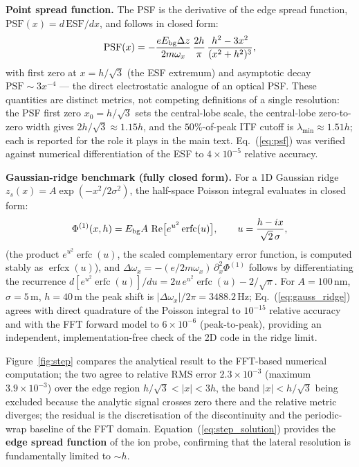 \documentclass[12pt,a4paper]{article}
\begin{document}
\textbf{Point spread function.}
The PSF is the derivative of the edge spread function,
$\mathrm{PSF}(x) = d\,\mathrm{ESF}/dx$, and follows in closed form:
\begin{equation}
\mathrm{PSF}(x) = -\frac{e E_{\rm bg}\Delta z}{2m\omega_x}\,
    \frac{2h}{\pi}\,\frac{h^2 - 3x^2}{(x^2+h^2)^3},
\label{eq:psf}
\end{equation}
with first zero at $x = h/\sqrt{3}$ (the ESF extremum) and asymptotic
decay $\mathrm{PSF}\sim 3x^{-4}$ --- the direct electrostatic analogue of
an optical PSF.  These quantities are distinct metrics, not competing
definitions of a single resolution: the PSF first zero
$x_0 = h/\sqrt{3}$ sets the central-lobe scale, the central-lobe
zero-to-zero width gives $2h/\sqrt3\approx1.15h$, and the $50\%$-of-peak ITF
cutoff is $\lambda_{\min}\approx1.51h$; each is reported for the role it
plays in the main text.  Eq.~(\ref{eq:psf}) was verified against numerical
differentiation of the ESF to $4\times10^{-5}$ relative accuracy.

\textbf{Gaussian-ridge benchmark (fully closed form).}
For a 1D Gaussian ridge $z_s(x)=A\exp(-x^2/2\sigma^2)$, the half-space
Poisson integral evaluates in closed form:
\begin{equation}
\Phi^{(1)}(x,h) = E_{\rm bg}A\,
    \operatorname{Re}\bigl[e^{u^2}\operatorname{erfc}(u)\bigr],
\qquad
u = \frac{h - ix}{\sqrt{2}\,\sigma},
\label{eq:gauss_ridge}
\end{equation}
(the product $e^{u^2}\operatorname{erfc}(u)$, the scaled complementary
error function, is computed stably as $\operatorname{erfcx}(u)$), and
$\Delta\omega_x = -(e/2m\omega_x)\,\partial_x^2\Phi^{(1)}$ follows by
differentiating the recurrence
$d[e^{u^2}\operatorname{erfc}(u)]/du = 2u\,e^{u^2}\operatorname{erfc}(u)
-2/\sqrt\pi$.  For $A=100$\,nm, $\sigma=5$\,\textmu m, $h=40$\,\textmu m
the peak shift is $|\Delta\omega_x|/2\pi = 3488.2$\,Hz;
Eq.~(\ref{eq:gauss_ridge}) agrees with direct quadrature of the Poisson
integral to $10^{-15}$ relative accuracy and with the FFT forward model
to $6\times10^{-6}$ (peak-to-peak), providing an independent,
implementation-free check of the 2D code in the ridge limit.

Figure~\ref{fig:step} compares the analytical result
to the FFT-based numerical computation; the two agree to relative RMS
error $2.3\times10^{-3}$ (maximum $3.9\times10^{-3}$) over the edge
region $h/\sqrt3<|x|<3h$, the band $|x|<h/\sqrt3$ being excluded because
the analytic signal crosses zero there and the relative metric diverges;
the residual is the discretisation of the discontinuity and the periodic-wrap
baseline of the FFT domain.  Equation~(\ref{eq:step_solution}) provides the
\textbf{edge spread function} of the ion probe, confirming that the
lateral resolution is fundamentally limited to ${\sim}h$.
\end{document}
